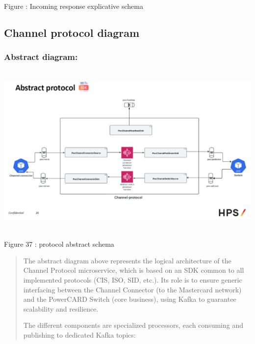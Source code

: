 \documentclass[12pt,a4paper]{report}
\begin{document}
\protect\hypertarget{_Toc201954512}{}{}Figure : Incoming response
explicative schema

\hypertarget{channel-protocol-diagram}{%
\subsection{\texorpdfstring{\textbf{Channel protocol
diagram}}{Channel protocol diagram}}\label{channel-protocol-diagram}}

\hypertarget{abstract-diagram-1}{%
\subsubsection{\texorpdfstring{\textbf{Abstract
diagram:}}{Abstract diagram:}}\label{abstract-diagram-1}}

\includegraphics[width=6.58396in,height=3.38664in]{vertopal_d1b0b2209edd4c6aa8254f57daa0953b/media/image56.png}

\protect\hypertarget{_Toc201954513}{}{}Figure 37 : protocol abstract
schema

\begin{quote}
The abstract diagram above represents the logical architecture of the
Channel Protocol microservice, which is based on an SDK common to all
implemented protocols (CIS, ISO, SID, etc.). Its role is to ensure
generic interfacing between the Channel Connector (to the Mastercard
network) and the PowerCARD Switch (core business), using Kafka to
guarantee scalability and resilience.

The different components are specialized processors, each consuming and
publishing to dedicated Kafka topics:
\end{quote}
\end{document}
